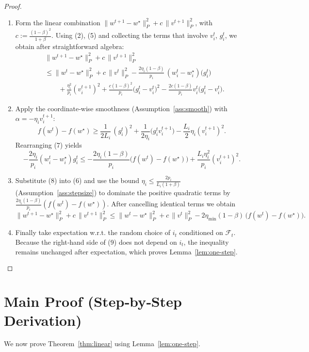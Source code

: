 \documentclass{article}
\begin{document}
\begin{proof}
\begin{enumerate}[label=[Step \arabic*],leftmargin=*]
\item Form the linear combination $\|w^{t+1}-w^{\star}\|_{P}^{2}+c\,\|v^{t+1}\|_{P}^{2}$,
with $c:=\frac{(1-\beta)^{2}}{1+\beta}$.  Using (2), (5) and collecting the terms that involve $v_{i}^{t}$, $g_{i}^{t}$, we obtain after straightforward algebra:
\[
\begin{aligned}
&\|w^{t+1}-w^{\star}\|_{P}^{2}+c\,\|v^{t+1}\|_{P}^{2} \\
&\le
\|w^{t}-w^{\star}\|_{P}^{2}+c\,\|v^{t}\|_{P}^{2}
 -\frac{2\eta_i(1-\beta)}{p_i}\,(w_i^{t}-w_i^{\star})\bigl(g_{i}^{t}\bigr) \\
&\qquad
+\frac{\eta_i^{2}}{p_i}(v_{i}^{t+1})^{2}
+\frac{c(1-\beta)^{2}}{p_i}\bigl(g_{i}^{t}-v_{i}^{t}\bigr)^{2}
-\frac{2c(1-\beta)}{p_i}v_{i}^{t}\bigl(g_{i}^{t}-v_{i}^{t}\bigr).
\end{aligned}
\tag{6}
\]

\item Apply the coordinate‑wise smoothness (Assumption~\ref{ass:smooth}) with $\alpha= -\eta_i v_{i}^{t+1}$:
\[
f(w^{t})-f(w^{\star})\ge
\frac{1}{2L_i}\,(g_{i}^{t})^{2}
+\frac{1}{2\eta_i}\bigl(g_{i}^{t}v_{i}^{t+1}\bigr)
-\frac{L_i}{2}\eta_i (v_{i}^{t+1})^{2}.
\tag{7}
\]
Rearranging (7) yields
\[
-\frac{2\eta_i}{p_i}(w_i^{t}-w_i^{\star})g_{i}^{t}
\le
-\frac{2\eta_i(1-\beta)}{p_i}\bigl(f(w^{t})-f(w^{\star})\bigr)
+\frac{L_i\eta_i^{2}}{p_i}(v_{i}^{t+1})^{2}.
\tag{8}
\]

\item Substitute (8) into (6) and use the bound $\eta_i\le \frac{2p_i}{L_i(1+\beta)}$ (Assumption~\ref{ass:stepsize}) to dominate the positive quadratic terms by $\frac{2\eta_i(1-\beta)}{p_i}(f(w^{t})-f(w^{\star}))$.
After cancelling identical terms we obtain
\[
\|w^{t+1}-w^{\star}\|_{P}^{2}+c\,\|v^{t+1}\|_{P}^{2}
\le
\|w^{t}-w^{\star}\|_{P}^{2}+c\,\|v^{t}\|_{P}^{2}
-2\eta_{\min}(1-\beta)\,\bigl(f(w^{t})-f(w^{\star})\bigr).
\tag{9}
\]

\item Finally take expectation w.r.t. the random choice of $i_t$ conditioned on $\mathcal{F}_{t}$.  Because the right‑hand side of (9) does not depend on $i_t$, the inequality remains unchanged after expectation, which proves Lemma~\ref{lem:one-step}.
\end{enumerate}
\end{proof}

\section*{Main Proof (Step‑by‑Step Derivation)}
We now prove Theorem~\ref{thm:linear} using Lemma~\ref{lem:one-step}.
\end{document}
